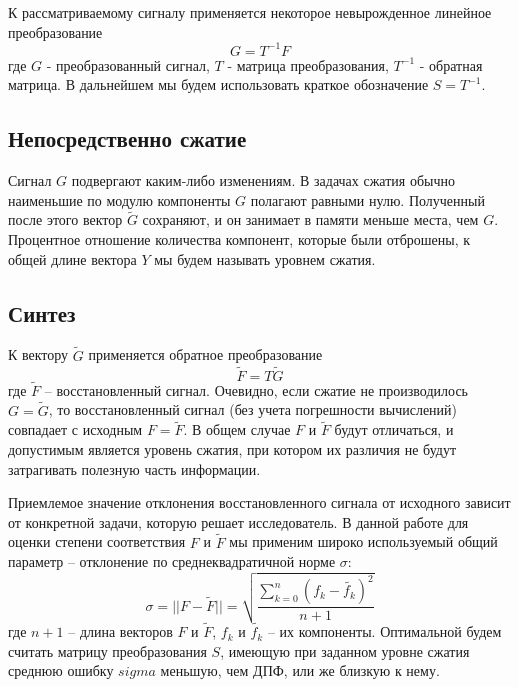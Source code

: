 \documentclass[11pt, oneside, a4paper]{article}
\begin{document}
К рассматриваемому сигналу применяется некоторое невырожденное линейное преобразование
\begin{equation}
\label{directConverstion}
    G = T^{-1} F
\end{equation}
где $G$ - преобразованный сигнал, $T$ - матрица преобразования, $T^{-1}$ - обратная матрица. В дальнейшем мы будем использовать краткое обозначение $S = T^{-1}$.

\subsection{Непосредственно сжатие} 

Сигнал $G$ подвергают каким-либо изменениям. В задачах сжатия обычно наименьшие по модулю компоненты $G$ полагают равными нулю. Полученный после этого вектор $\tilde{G}$ сохраняют, и он занимает в памяти меньше места, чем $G$. Процентное отношение количества компонент, которые были отброшены, к общей длине вектора $Y$ мы будем называть уровнем сжатия.

\subsection{Синтез} 

К вектору $\tilde{G}$ применяется обратное преобразование 
\begin{equation}
\label{inverseConverstion}
    \tilde{F} = T\tilde{G}
\end{equation}
где $\tilde{F}$ – восстановленный сигнал. Очевидно, если сжатие не производилось $G=\tilde{G}$, то восстановленный сигнал (без учета погрешности вычислений) совпадает с исходным $F=\tilde{F}$. В общем случае $F$ и $\tilde{F}$ будут отличаться, и допустимым является уровень сжатия, при котором их различия не будут затрагивать полезную часть информации.

Приемлемое значение отклонения восстановленного сигнала от исходного зависит от конкретной задачи, которую решает исследователь. В данной работе для оценки степени соответствия $F$ и $\tilde{F}$ мы применим широко используемый общий параметр – отклонение по среднеквадратичной норме $\sigma$:
\begin{equation}
\label{squareNorm}
    \sigma = ||F-\tilde{F}||=\sqrt{\frac{\sum\limits_{k=0}^{n}(f_k-\tilde{f_k})^2}{n+1}}
\end{equation}
где $n+1$ – длина векторов $F$ и $\tilde{F}$, $f_k$ и $\tilde{f_k}$ – их компоненты. Оптимальной будем считать матрицу преобразования $S$, имеющую при заданном уровне сжатия среднюю ошибку $sigma$ меньшую, чем ДПФ, или же близкую к нему.
\end{document}
